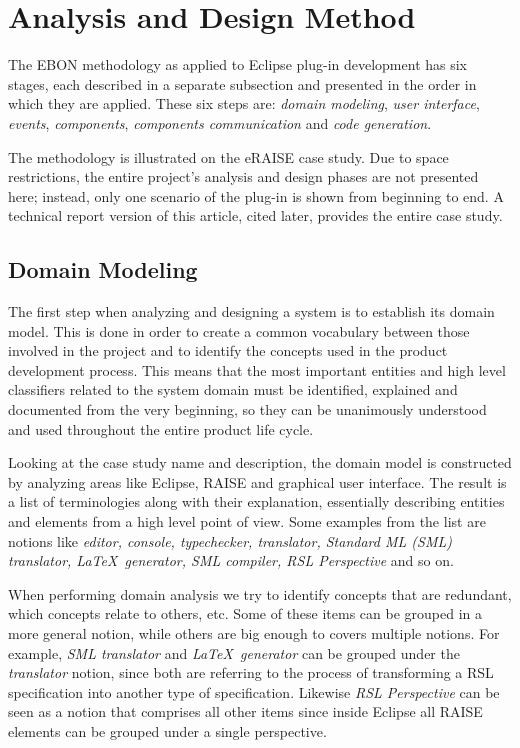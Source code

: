 \documentclass[conference]{IEEEtran}
\begin{document}
\section{Analysis and Design Method}
\label{sec:analys-design-meth}

The EBON methodology as applied to Eclipse plug-in development has six
stages, each described in a separate subsection and presented in the
order in which they are applied. These six steps are: \emph{domain
  modeling}, \emph{user interface}, \emph{events}, \emph{components},
\emph{components communication} and \emph{code generation}.

The methodology is illustrated on the eRAISE case study.  Due to space
restrictions, the entire project's analysis and design phases are not
presented here; instead, only one scenario of the plug-in is shown
from beginning to end.  A technical report version of this article,
cited later, provides the entire case study.

%
\subsection{Domain Modeling}
\label{sec:domain-modeling}

The first step when analyzing and designing a system is to establish
its domain model. This is done in order to create a common vocabulary
between those involved in the project and to identify the concepts
used in the product development process. This means that the most
important entities and high level classifiers related to the system
domain must be identified, explained and documented from the very
beginning, so they can be unanimously understood and used throughout
the entire product life cycle.

Looking at the case study name and description, the domain model is
constructed by analyzing areas like Eclipse, RAISE and graphical user
interface. The result is a list of terminologies along with
their explanation, essentially describing entities and elements from a
high level point of view. Some examples from the list are notions like
\emph{editor, console, typechecker, translator, Standard ML
(SML) translator, \LaTeX\ generator, SML compiler, RSL
Perspective} and so on. 

When performing domain analysis we try to identify concepts that are
redundant, which concepts relate to others, etc.  Some of these items
can be grouped in a more general notion, while others are big enough
to covers multiple notions.  For example, \emph{SML translator} and
\emph{\LaTeX\ generator} can be grouped under the \emph{translator}
notion, since both are referring to the process of transforming a RSL
specification into another type of specification. Likewise \emph{RSL
  Perspective} can be seen as a notion that comprises all other items
since inside Eclipse all RAISE elements can be grouped under a single
perspective.
\end{document}
